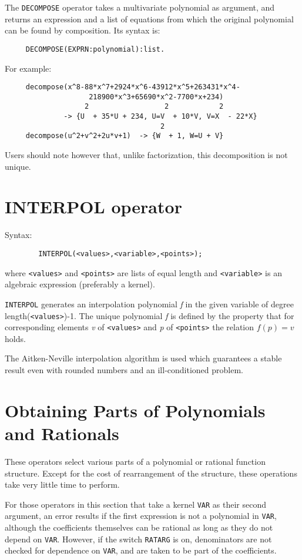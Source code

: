 \documentclass[11pt,letterpaper]{book}
\makeatletter
\newcommand{\underscore}{\_}
\newcommand{\ttindex}[1]{{\renewcommand{\_}{\protect\underscore}%
                          \index{#1@{\tt #1}}}}
\makeatother
\begin{document}
The {\tt DECOMPOSE} operator takes a multivariate polynomial as argument,
and returns an expression and a list of equations from which the
original polynomial can be found by composition.  Its syntax is:
{\small\begin{verbatim}
     DECOMPOSE(EXPRN:polynomial):list.
\end{verbatim}}
For example:
{\small\begin{verbatim}
     decompose(x^8-88*x^7+2924*x^6-43912*x^5+263431*x^4-
                    218900*x^3+65690*x^2-7700*x+234)
                   2                  2            2
              -> {U  + 35*U + 234, U=V  + 10*V, V=X  - 22*X}
                                     2
     decompose(u^2+v^2+2u*v+1)  -> {W  + 1, W=U + V}
\end{verbatim}}
Users should note however that, unlike factorization, this decomposition
is not unique.

\section{INTERPOL operator}\ttindex{INTERPOL}

Syntax:
{\small\begin{verbatim}
        INTERPOL(<values>,<variable>,<points>);
\end{verbatim}}

where {\tt <values>} and {\tt <points>} are lists of equal length and
{\tt <variable>} is an algebraic expression (preferably a kernel).

{\tt INTERPOL} generates an interpolation polynomial {\em f\/} in the given
variable of degree length({\tt <values>})-1.  The unique polynomial {\em f\/}
is defined by the property that for corresponding elements {\em v\/} of
{\tt <values>} and {\em p\/} of {\tt <points>} the relation $f(p)=v$ holds.

The Aitken-Neville interpolation algorithm is used which guarantees a
stable result even with rounded numbers and an ill-conditioned problem.

\section{Obtaining Parts of Polynomials and Rationals}

These operators select various parts of a polynomial or rational function
structure. Except for the cost of rearrangement of the structure, these
operations take very little time to perform.

For those operators in this section that take a kernel {\tt VAR} as their
second argument, an error results if the first expression is not a
polynomial in {\tt VAR}, although the coefficients themselves can be
rational as long as they do not depend on {\tt VAR}.  However, if the
switch {\tt RATARG}\ttindex{RATARG} is on, denominators are not checked
for dependence on {\tt VAR}, and are taken to be part of the coefficients.
\end{document}
